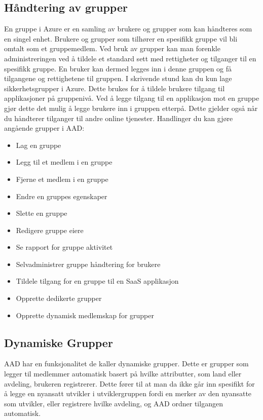 \subsection{Håndtering av grupper}
\label{subsec::konfigurasjon_handteringAvRollerOgGrupper_grupper}
En gruppe i Azure er en samling av brukere og grupper som kan håndteres som en singel enhet. Brukere og grupper som tilhører en spesifikk gruppe vil bli omtalt som et gruppemedlem. Ved bruk av grupper kan man forenkle administreringen ved å tildele et standard sett med rettigheter og tilganger til en spesifikk gruppe. En bruker kan dermed legges inn i denne gruppen og få tilgangene og rettighetene til gruppen. I skrivende stund kan du kun lage sikkerhetsgrupper i Azure. Dette brukes for å tildele brukere tilgang til applikasjoner på gruppenivå. Ved å legge tilgang til en applikasjon mot en gruppe gjør dette det mulig å legge brukere inn i gruppen etterpå. Dette gjelder også når du håndterer tilganger til andre online tjenester. Handlinger du kan gjøre angående grupper i AAD:

\begin{itemize}
\item Lag en gruppe
\item Legg til et medlem i en gruppe
\item Fjerne et medlem i en gruppe
\item Endre en gruppes egenskaper
\item Slette en gruppe
\item Redigere gruppe eiere
\item Se rapport for gruppe aktivitet
\item Selvadministrer gruppe håndtering for brukere
\item Tildele tilgang for en gruppe til en SaaS applikasjon
\item Opprette dedikerte grupper
\item Opprette dynamisk medlemskap for grupper
\end{itemize}

\subsection*{Dynamiske Grupper}
AAD har en funksjonalitet de kaller dynamiske grupper. Dette er grupper som legger til medlemmer automatisk basert på hvilke attributter, som land eller avdeling, brukeren registrerer. Dette fører til at man da ikke går inn spesifikt for å legge en nyansatt utvikler i utviklergruppen fordi en merker av den nyansatte som utvikler, eller registrere hvilke avdeling, og AAD ordner tilgangen automatisk.

